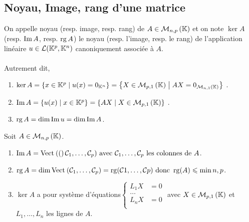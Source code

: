 \subsection{Noyau, Image, rang d’une matrice}
\begin{defi}
    On appelle noyau (resp. image, resp. rang) de \(A \in \M{n,p}\) et on note \(\ker A\) (resp. \(\operatorname{Im} A\), resp. \(\operatorname{rg} A\)) le noyau (resp. l’image, resp. le rang) de l’application linéaire \(u \in \mathcal{L} (\mathbb{K}^p, \mathbb{K}^n)\) canoniquement associée à \(A\).\\~\\
    Autrement dit,
    \begin{enumerate}
        \item \(\ker A = \accol{x \in \K^p \tq u(x) = 0_{\K^n} } = \accol{X \in \M{p,1} \tq AX = 0_{\M{n,1}}}\) .
        \item \(\im A = \accol{u(x)\tq x \in \K^p} = \accol{AX\tq X \in \M{p,1}}\) .
        \item \(\operatorname{rg} A = \dim \operatorname{Im} u = \dim \operatorname{Im} A\).  
    \end{enumerate}
\end{defi}

\begin{prop}
    Soit \(A \in \M{n,p}\).
    \begin{enumerate}
        \item \(\im A = \Vect (\cal{C}_1, \dots , \cal{C}_p) \text{ avec } \cal{C}_1, \dots , \cal{C}_p \text{ les colonnes de  }A\).
        \item \(\rg A = \dim \Vect{\cal{C}_1, \dots , \cal{C}_p} = \rg (\cal{C}1, \dots , \cal{C}p) \text{ donc }\rg(A) \leq  \min{n, p}\).
        \item \(\ker A\) a pour système d’équations\(
        \begin{cases}            
            L_1X &= 0\\
            \dots\\
            L_nX &= 0\\
            \end{cases}
            \)
            avec \(X \in \M{p,1}\) et \(L_1, \dots , L_n\) les lignes de \(A\).
    \end{enumerate}
\end{prop}

